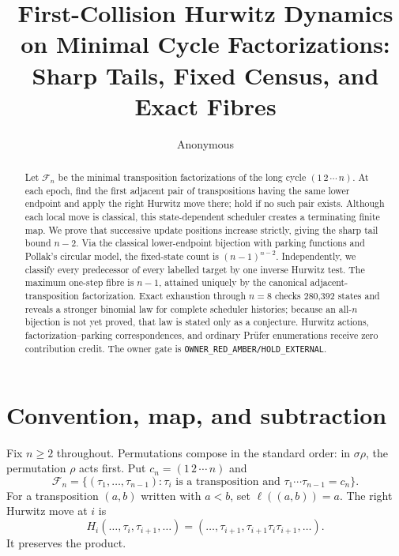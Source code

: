 \documentclass[a4paper,10pt]{amsart}
\title[First-collision Hurwitz dynamics]{First-Collision Hurwitz Dynamics on
Minimal Cycle Factorizations: Sharp Tails, Fixed Census, and Exact Fibres}
\author{Anonymous}
\date{}
\theoremstyle{remark}
\newcommand{\Fcal}{\mathcal F}
\begin{document}
\begin{abstract}
Let $\mathcal F_n$ be the minimal transposition factorizations of the long
cycle $(1\,2\,\cdots\,n)$.  At each epoch, find the first adjacent pair of
transpositions having the same lower endpoint and apply the right Hurwitz
move there; hold if no such pair exists.  Although each local move is
classical, this state-dependent scheduler creates a terminating finite map.
We prove that successive update positions increase strictly, giving the
sharp tail bound $n-2$.  Via the classical lower-endpoint bijection with
parking functions and Pollak's circular model, the fixed-state count is
$(n-1)^{n-2}$.  Independently, we classify every predecessor of every
labelled target by one inverse Hurwitz test.  The maximum one-step fibre is
$n-1$, attained uniquely by the canonical adjacent-transposition
factorization.  Exact exhaustion through $n=8$ checks 280,392 states and
reveals a stronger binomial law for complete scheduler histories; because an
all-$n$ bijection is not yet proved, that law is stated only as a conjecture.
Hurwitz actions, factorization--parking correspondences, and ordinary
Pr\"ufer enumerations receive zero contribution credit.  The owner gate is
\texttt{OWNER\_RED\_AMBER/HOLD\_EXTERNAL}.
\end{abstract}

\maketitle

\section{Convention, map, and subtraction}

Fix $n\ge2$ throughout.
Permutations compose in the standard order: in $\sigma\rho$, the permutation
$\rho$ acts first.  Put $c_n=(1\,2\,\cdots\,n)$ and
\begin{equation}\label{eq:carrier}
 \Fcal_n=\{(\tau_1,\ldots,\tau_{n-1}):
 \tau_i\text{ is a transposition and }\tau_1\cdots\tau_{n-1}=c_n\}.
\end{equation}
For a transposition $(a,b)$ written with $a<b$, set $\ell((a,b))=a$.
The right Hurwitz move at $i$ is
\begin{equation}\label{eq:hurwitz}
 H_i(\ldots,\tau_i,\tau_{i+1},\ldots)
 =(\ldots,\tau_{i+1},\tau_{i+1}\tau_i\tau_{i+1},\ldots).
\end{equation}
It preserves the product.
\end{document}

